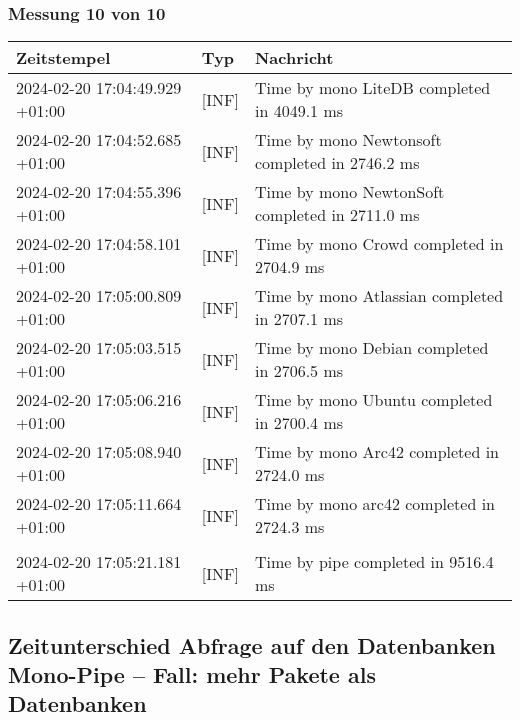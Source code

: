     \subsubsection{Messung 10 von 10} \label{subsubsec:LiteDbWenigerPaketeAlsDb10von10}
        {
            {\small
                \begin{tabularx}{\textwidth}{|l|l|X|}
                    \hline
                    \textbf{Zeitstempel} & \textbf{Typ} & \textbf{Nachricht} \\
                    \hline
                    \endhead
                    2024-02-20 17:04:49.929 +01:00 & [INF] & Time by mono LiteDB completed in 4049.1 ms \\
                    2024-02-20 17:04:52.685 +01:00 & [INF] & Time by mono Newtonsoft completed in 2746.2 ms \\
                    2024-02-20 17:04:55.396 +01:00 & [INF] & Time by mono NewtonSoft completed in 2711.0 ms \\
                    2024-02-20 17:04:58.101 +01:00 & [INF] & Time by mono Crowd completed in 2704.9 ms \\
                    2024-02-20 17:05:00.809 +01:00 & [INF] & Time by mono Atlassian completed in 2707.1 ms \\
                    2024-02-20 17:05:03.515 +01:00 & [INF] & Time by mono Debian completed in 2706.5 ms \\
                    2024-02-20 17:05:06.216 +01:00 & [INF] & Time by mono Ubuntu completed in 2700.4 ms \\
                    2024-02-20 17:05:08.940 +01:00 & [INF] & Time by mono Arc42 completed in 2724.0 ms \\
                    2024-02-20 17:05:11.664 +01:00 & [INF] & Time by mono arc42 completed in 2724.3 ms \\
                    & & \\
                    2024-02-20 17:05:21.181 +01:00 & [INF] & Time by pipe completed in 9516.4 ms \\
                    \hline
                \end{tabularx}
            }
        }

\subsection{Zeitunterschied Abfrage auf den Datenbanken Mono-Pipe -- Fall: mehr Pakete als Datenbanken} \label{subsec:ZeitunterschiedAbfrageAufDenDatenbankenMonoPipeFallMehrPaketeAlsDatenbanken}
    